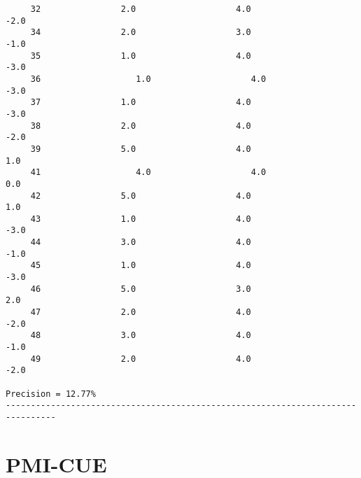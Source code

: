 \documentclass[11pt]{report} %
\begin{document}
\begin{verbatim}
     32                2.0                    4.0                   -2.0
     34                2.0                    3.0                   -1.0
     35                1.0                    4.0                   -3.0
     36 	              1.0                    4.0                   -3.0
     37                1.0                    4.0                   -3.0
     38                2.0                    4.0                   -2.0
     39                5.0                    4.0                    1.0
     41 	              4.0                    4.0                    0.0
     42                5.0                    4.0                    1.0
     43                1.0                    4.0                   -3.0
     44                3.0                    4.0                   -1.0
     45                1.0                    4.0                   -3.0
     46                5.0                    3.0                    2.0
     47                2.0                    4.0                   -2.0
     48                3.0                    4.0                   -1.0
     49                2.0                    4.0                   -2.0

Precision = 12.77%
--------------------------------------------------------------------------------

\end{verbatim}

	\section{PMI-CUE}
\end{document}
